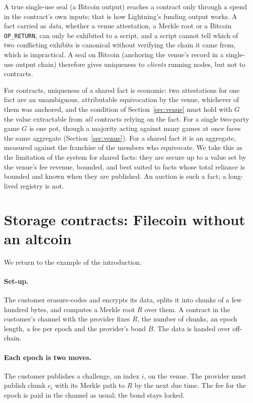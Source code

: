 \documentclass[11pt]{article}
\begin{document}
A true single-use seal (a Bitcoin output) reaches a contract only
through a spend in the contract's own inputs; that is how Lightning's
funding output works. A fact carried as \emph{data}, whether a venue
attestation, a Merkle root or a Bitcoin \texttt{OP\_RETURN}, can only
be exhibited to a script, and a script cannot tell which of two
conflicting exhibits is canonical without verifying the chain it came
from, which is impractical. A seal on Bitcoin (anchoring the venue's
record in a single-use output chain) therefore gives uniqueness to
\emph{clients} running nodes, but not to contracts.

For contracts, uniqueness of a shared fact is economic: two attestations
for one fact are an unambiguous, attributable equivocation by the venue,
whichever of them was anchored, and the condition of
Section~\ref{sec:venue} must hold with $G$ the value extractable from
\emph{all} contracts relying on the fact. For a single two-party game $G$ is one
pot, though a majority acting against many games at once faces the
same aggregate (Section~\ref{sec:venue}). For a shared fact it is an aggregate, measured against the
franchise of the members who equivocate. We take this as the limitation
of the system for shared facts: they are secure up to a value set by the
venue's fee revenue, bounded, and best suited to facts whose total
reliance is bounded and known when they are published. An auction is
such a fact; a long-lived registry is not.

\section{Storage contracts: Filecoin without an altcoin}
\label{sec:storage}

We return to the example of the introduction.

\paragraph{Set-up.} The customer erasure-codes and encrypts its data,
splits it into chunks of a few hundred bytes, and computes a Merkle root
$R$ over them. A contract in the customer's channel with the provider
fixes $R$, the number of chunks, an epoch length, a fee per epoch and
the provider's bond $B$. The data is handed over off-chain.

\paragraph{Each epoch is two moves.} The customer publishes a challenge,
an index $i$, on the venue. The provider must publish chunk $c_i$ with
its Merkle path to $R$ by the next due time. The fee for the epoch is paid in
the channel as usual; the bond stays locked.
\end{document}
